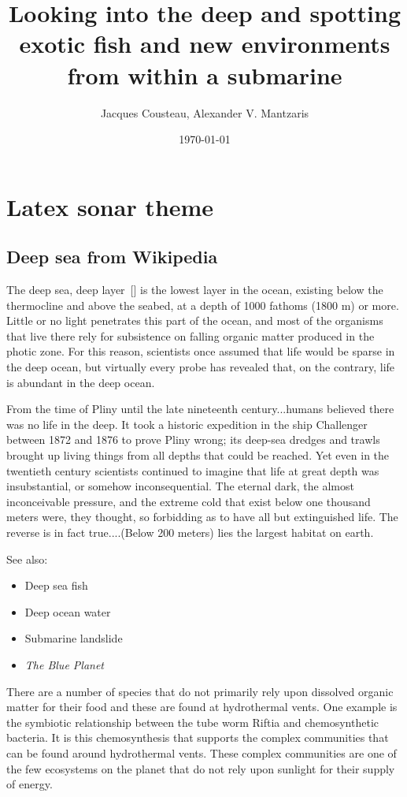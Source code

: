 \documentclass[12pt]{article}
\title{Looking into the deep and spotting exotic fish and new environments from within a submarine}
\author{Jacques Cousteau, Alexander V. Mantzaris}
\date{\today}
\begin{document}
\maketitle




\section{Latex sonar theme}

\subsection{Deep sea from Wikipedia}
The deep sea, deep layer~[\cite{gortney2010department}] is the lowest layer in the ocean, existing below the thermocline and above the seabed, at a depth of 1000 fathoms (1800 m) or more. Little or no light penetrates this part of the ocean, and most of the organisms that live there rely for subsistence on falling organic matter produced in the photic zone. For this reason, scientists once assumed that life would be sparse in the deep ocean, but virtually every probe has revealed that, on the contrary, life is abundant in the deep ocean.

    From the time of Pliny until the late nineteenth century...humans believed there was no life in the deep. It took a historic expedition in the ship Challenger between 1872 and 1876 to prove Pliny wrong; its deep-sea dredges and trawls brought up living things from all depths that could be reached. Yet even in the twentieth century scientists continued to imagine that life at great depth was insubstantial, or somehow inconsequential. The eternal dark, the almost inconceivable pressure, and the extreme cold that exist below one thousand meters were, they thought, so forbidding as to have all but extinguished life. The reverse is in fact true....(Below 200 meters) lies the largest habitat on earth.

 See also:
\begin{itemize}
\item Deep sea fish
\item Deep ocean water
\item Submarine landslide
\item \emph{The Blue Planet}
\end{itemize}

There are a number of species that do not primarily rely upon dissolved organic matter for their food and these are found at hydrothermal vents. One example is the symbiotic relationship between the tube worm Riftia and chemosynthetic bacteria. It is this chemosynthesis that supports the complex communities that can be found around hydrothermal vents. These complex communities are one of the few ecosystems on the planet that do not rely upon sunlight for their supply of energy.
\end{document}
